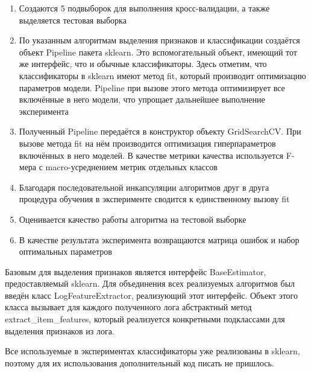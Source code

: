 \begin{enumerate}
\item Создаются 5 подвыборок для выполнения кросс-валидации, а также выделяется тестовая выборка
\item По указанным алгоритмам выделения признаков и классификации создаётся объект Pipeline пакета sklearn. Это вспомогательный объект, имеющий тот же интерфейс, что и обычные классификаторы. Здесь отметим, что классификаторы в sklearn имеют метод fit, который производит оптимизацию параметров модели. Pipeline при вызове этого метода оптимизирует все включённые в него модели, что упрощает дальнейшее выполнение эксперимента
\item Полученный Pipeline передаётся в конструктор объекту GridSearchCV. При вызове метода fit на нём производится оптимизация гиперпараметров включённых в него моделей. В качестве метрики качества используется F-мера с macro-усреднением метрик отдельных классов
\item Благодаря последовательной инкапсуляции алгоритмов друг в друга процедура обучения в эксперименте сводится к единственному вызову fit
\item Оценивается качество работы алгоритма на тестовой выборке
\item В качестве результата эксперимента возвращаются матрица ошибок и набор оптимальных параметров
\end{enumerate}

Базовым для выделения признаков является интерфейс BaseEstimator, предоставляемый sklearn. Для объединения всех реализуемых алгоритмов был введён класс LogFeatureExtractor, реализующий этот интерфейс. Объект этого класса вызывает для каждого полученного лога абстрактный метод extract_item_features, который реализуется конкретными подклассами для выделения признаков из лога. 

Все используемые в экспериментах классификаторы уже реализованы в sklearn, поэтому для их использования дополнительный код писать не пришлось. 

